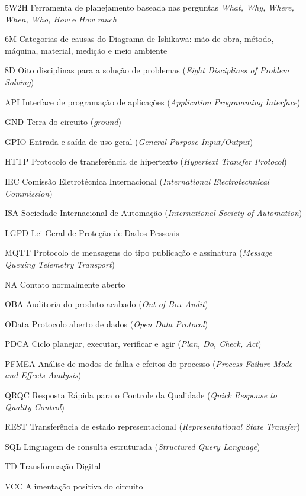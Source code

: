 \begin{siglas}
  \item[5W2H] Ferramenta de planejamento baseada nas perguntas \textit{What, Why, Where, When, Who, How} e \textit{How much}
  \item[6M] Categorias de causas do Diagrama de Ishikawa: mão de obra, método, máquina, material, medição e meio ambiente
  \item[8D] Oito disciplinas para a solução de problemas (\textit{Eight Disciplines of Problem Solving})
  \item[API] Interface de programação de aplicações (\textit{Application Programming Interface})
  \item[GND] Terra do circuito (\textit{ground})
  \item[GPIO] Entrada e saída de uso geral (\textit{General Purpose Input/Output})
  \item[HTTP] Protocolo de transferência de hipertexto (\textit{Hypertext Transfer Protocol})
  \item[IEC] Comissão Eletrotécnica Internacional (\textit{International Electrotechnical Commission})
  \item[ISA] Sociedade Internacional de Automação (\textit{International Society of Automation})
  \item[LGPD] Lei Geral de Proteção de Dados Pessoais
  \item[MQTT] Protocolo de mensagens do tipo publicação e assinatura (\textit{Message Queuing Telemetry Transport})
  \item[NA] Contato normalmente aberto
  \item[OBA] Auditoria do produto acabado (\textit{Out-of-Box Audit})
  \item[OData] Protocolo aberto de dados (\textit{Open Data Protocol})
  \item[PDCA] Ciclo planejar, executar, verificar e agir (\textit{Plan, Do, Check, Act})
  \item[PFMEA] Análise de modos de falha e efeitos do processo (\textit{Process Failure Mode and Effects Analysis})
  \item[QRQC] Resposta Rápida para o Controle da Qualidade (\textit{Quick Response to Quality Control})
  \item[REST] Transferência de estado representacional (\textit{Representational State Transfer})
  \item[SQL] Linguagem de consulta estruturada (\textit{Structured Query Language})
  \item[TD] Transformação Digital
  \item[VCC] Alimentação positiva do circuito
\end{siglas}
